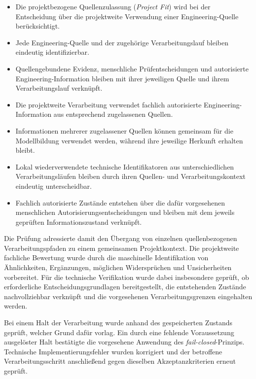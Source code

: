 \begin{itemize}
    \item Die projektbezogene Quellenzulassung (\emph{Project Fit}) wird bei
          der Entscheidung über die projektweite Verwendung einer
          Engineering-Quelle berücksichtigt.

    \item Jede Engineering-Quelle und der zugehörige Verarbeitungslauf
          bleiben eindeutig identifizierbar.

    \item Quellengebundene Evidenz, menschliche Prüfentscheidungen und
          autorisierte Engineering-Information bleiben mit ihrer jeweiligen
          Quelle und ihrem Verarbeitungslauf verknüpft.

    \item Die projektweite Verarbeitung verwendet fachlich autorisierte
          Engineering-Information aus entsprechend zugelassenen Quellen.

    \item Informationen mehrerer zugelassener Quellen können gemeinsam für
          die Modellbildung verwendet werden, während ihre jeweilige
          Herkunft erhalten bleibt.

    \item Lokal wiederverwendete technische Identifikatoren aus
          unterschiedlichen Verarbeitungsläufen bleiben durch ihren
          Quellen- und Verarbeitungskontext eindeutig unterscheidbar.

    \item Fachlich autorisierte Zustände entstehen über die dafür
          vorgesehenen menschlichen Autorisierungsentscheidungen und bleiben
          mit dem jeweils geprüften Informationszustand verknüpft.
\end{itemize}

Die Prüfung adressierte damit den Übergang von einzelnen quellenbezogenen
Verarbeitungspfaden zu einem gemeinsamen Projektkontext. Die projektweite
fachliche Bewertung wurde durch die maschinelle Identifikation von
Ähnlichkeiten, Ergänzungen, möglichen Widersprüchen und Unsicherheiten
vorbereitet. Für die technische Verifikation wurde dabei insbesondere
geprüft, ob erforderliche Entscheidungsgrundlagen bereitgestellt, die
entstehenden Zustände nachvollziehbar verknüpft und die vorgesehenen
Verarbeitungsgrenzen eingehalten werden.

Bei einem Halt der Verarbeitung wurde anhand des gespeicherten Zustands
geprüft, welcher Grund dafür vorlag. Ein durch eine fehlende Voraussetzung
ausgelöster Halt bestätigte die vorgesehene Anwendung des
\emph{fail-closed}-Prinzips. Technische Implementierungsfehler wurden
korrigiert und der betroffene Verarbeitungsschritt anschließend gegen
dieselben Akzeptanzkriterien erneut geprüft.

